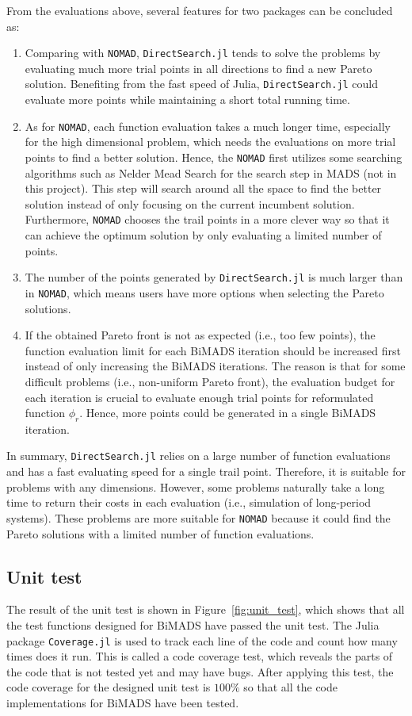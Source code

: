 \documentclass[11pt,oneside,onecolumn,openright]{article}
\begin{document}
From the evaluations above, several features for two packages can be concluded as:
\begin{enumerate}
  \item Comparing with \verb|NOMAD|, \verb|DirectSearch.jl| tends to solve the problems by evaluating much more trial points in all directions to find a new Pareto solution. Benefiting from the fast speed of Julia, \verb|DirectSearch.jl| could evaluate more points while maintaining a short total running time. 
  \item As for \verb|NOMAD|, each function evaluation takes a much longer time, especially for the high dimensional problem, which needs the evaluations on more trial points to find a better solution. Hence, the \verb|NOMAD| first utilizes some searching algorithms such as Nelder Mead Search for the search step in MADS (not in this project). This step will search around all the space to find the better solution instead of only focusing on the current incumbent solution. Furthermore, \verb|NOMAD| chooses the trail points in a more clever way so that it can achieve the optimum solution by only evaluating a limited number of points.
  \item The number of the points generated by \verb|DirectSearch.jl| is much larger than in \verb|NOMAD|, which means users have more options when selecting the Pareto solutions. 
  \item If the obtained Pareto front is not as expected (i.e., too few points), the function evaluation limit for each BiMADS iteration should be increased first instead of only increasing the BiMADS iterations. The reason is that for some difficult problems (i.e., non-uniform Pareto front), the evaluation budget for each iteration is crucial to evaluate enough trial points for reformulated function $\phi_r$. Hence, more points could be generated in a single BiMADS iteration.
\end{enumerate}

In summary, \verb|DirectSearch.jl| relies on a large number of function evaluations and has a fast evaluating speed for a single trail point. Therefore, it is suitable for problems with any dimensions. However, some problems naturally take a long time to return their costs in each evaluation (i.e., simulation of long-period systems). These problems are more suitable for \verb|NOMAD| because it could find the Pareto solutions with a limited number of function evaluations.

\subsection{Unit test}
The result of the unit test is shown in Figure~\ref{fig:unit_test}, which shows that all the test functions designed for BiMADS have passed the unit test. The Julia package \verb|Coverage.jl| is used to track each line of the code and count how many times does it run. This is called a code coverage test, which reveals the parts of the code that is not tested yet and may have bugs. After applying this test, the code coverage for the designed unit test is $100\%$ so that all the code implementations for BiMADS have been tested.
\end{document}
